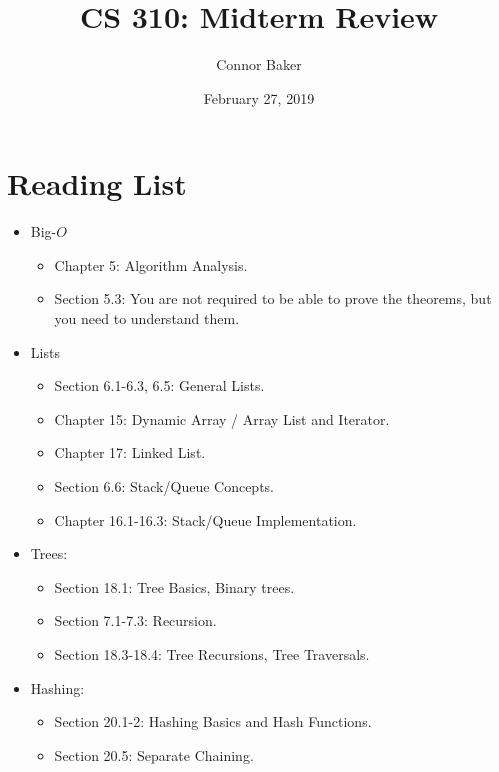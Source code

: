\documentclass[10pt]{article}
\title{CS 310: Midterm Review}
\author{Connor Baker}
\date{February 27, 2019}
\begin{document}
\maketitle

\tableofcontents

\thispagestyle{empty}

\pagebreak

\setcounter{page}{1}

\section{Reading List}
\begin{itemize}
    \item Big-$O$
    \begin{itemize}
        \item Chapter 5: Algorithm Analysis.
        \item Section 5.3: You are not required to be able to prove the theorems, but you need to understand them.
    \end{itemize}
    \item Lists
    \begin{itemize}
        \item Section 6.1-6.3, 6.5: General Lists.
        \item Chapter 15: Dynamic Array / Array List and Iterator.
        \item Chapter 17: Linked List.
        \item Section 6.6: Stack/Queue Concepts.
        \item Chapter 16.1-16.3: Stack/Queue Implementation.
    \end{itemize} 
    \item Trees:
    \begin{itemize}
        \item Section 18.1: Tree Basics, Binary trees.
        \item Section 7.1-7.3: Recursion.
        \item Section 18.3-18.4: Tree Recursions, Tree Traversals.
    \end{itemize}
    \item Hashing:
    \begin{itemize}
        \item Section 20.1-2: Hashing Basics and Hash Functions.
        \item Section 20.5: Separate Chaining.
    \end{itemize}
\end{itemize}
\end{document}
